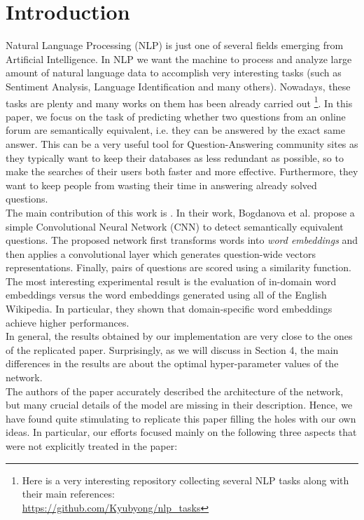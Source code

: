 \documentclass[10pt,twocolumn,letterpaper]{article}
\begin{document}
\section{Introduction}
Natural Language Processing (NLP) is just one of several fields emerging from Artificial Intelligence. In NLP we want the machine to process and analyze large amount of natural language data to accomplish very interesting tasks (such as Sentiment Analysis, Language Identification and many others). Nowadays, these tasks are plenty and many works on them has been already carried out \footnote{Here is a very interesting repository collecting several NLP tasks along with their main references: \\ \url{https://github.com/Kyubyong/nlp_tasks}}. In this paper, we focus on the task of predicting whether two questions from an online forum are semantically equivalent, i.e. they can be answered by the exact same answer. This can be a very useful tool for Question-Answering community sites as they typically want to keep their databases as less redundant as possible, so to make the searches of their users both faster and more effective. Furthermore, they want to keep people from wasting their time in answering already solved questions. \\
The main contribution of this work is \cite{bogdanova2015detecting}. In their work, Bogdanova et al. propose a simple Convolutional Neural Network (CNN) to detect semantically equivalent questions. The proposed network first transforms words into \emph{word embeddings} and then applies a convolutional layer which generates question-wide vectors representations. Finally, pairs of questions are scored using a similarity function. The most interesting experimental result is the evaluation of in-domain word embeddings versus the word embeddings generated using all of the English Wikipedia. In particular, they shown that domain-specific word embeddings achieve higher performances. \\

In general, the results obtained by our implementation are very close to the ones of the replicated paper. Surprisingly, as we will discuss in Section 4, the main differences in the results are about the optimal hyper-parameter values of the network.\\
The authors of the paper accurately described the architecture of the network, but many crucial details of the model are missing in their description. Hence, we have found quite stimulating to replicate this paper filling the holes with our own ideas. In particular, our efforts focused mainly on the following three aspects that were not explicitly treated in the paper: 
\end{document}
